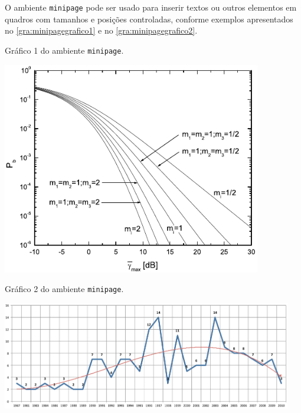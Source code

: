 O ambiente \texttt{minipage} pode ser usado para inserir textos ou outros elementos em quadros com tamanhos e posi\c{c}\~oes controladas, conforme exemplos apresentados no \autoref{gra:minipagegrafico1} e no \autoref{gra:minipagegrafico2}.

\begin{graph}[Htb]%
\begin{minipage}[t]{0.395\textwidth}%
\centering%
\captionsetup{width=0.85\textwidth}%
\caption{Gr\'afico 1 do ambiente \texttt{minipage}.}%
\label{gra:minipagegrafico1}%
\includegraphics[width=0.85\textwidth]{./CapituloExemplo/grafico1}%
\end{minipage}
\hfill
\begin{minipage}[t]{0.595\textwidth}%
\centering%
\captionsetup{width=0.95\textwidth}%
\caption{Gr\'afico 2 do ambiente \texttt{minipage}.}%
\label{gra:minipagegrafico2}%
\includegraphics[width=0.95\textwidth]{./CapituloExemplo/grafico2}%
\end{minipage}
\label{gra:minipagegraficos}
\end{graph}

